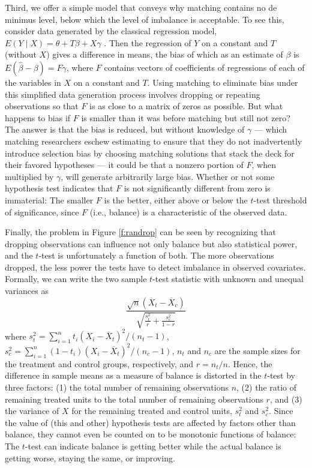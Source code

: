 \documentclass[11pt,titlepage]{article}
\begin{document}
Third, we offer a simple model that conveys why matching contains no
de minimus level, below which the level of imbalance is acceptable.
To see this, consider data generated by the classical regression
model, $E(Y\mid X)= \theta + T\beta + X\gamma$ \citep{Goldberger91}.
Then the regression of $Y$ on a constant and $T$ (without $X$) gives a
difference in means, the bias of which as an estimate of $\beta$ is
$E(\hat\beta-\beta) = F\gamma$, where $F$ contains vectors of
coefficients of regressions of each of the variables in $X$ on a
constant and $T$.  Using matching to eliminate bias under this
simplified data generation process involves dropping or repeating
observations so that $F$ is as close to a matrix of zeros as possible.
But what happens to bias if $F$ is smaller than it was before matching
but still not zero?  The answer is that the bias is reduced, but
without knowledge of $\gamma$ --- which matching researchers eschew
estimating to ensure that they do not inadvertently introduce
selection bias by choosing matching solutions that stack the deck for
their favored hypotheses --- it could be that a nonzero portion of
$F$, when multiplied by $\gamma$, will generate arbitrarily large
bias.  Whether or not some hypothesis test indicates that $F$ is not
significantly different from zero is immaterial: The smaller $F$ is
the better, either above or below the $t$-test threshold of
significance, since $F$ (i.e., balance) is a characteristic of the
observed data.

Finally, the problem in Figure \ref{f:randrop} can be seen by
recognizing that dropping observations can influence not only balance
but also statistical power, and the $t$-test is unfortunately a
function of both.  The more observations dropped, the less power the
tests have to detect imbalance in observed covariates.  Formally, we
can write the two sample $t$-test statistic with unknown and
unequal variances as
\begin{equation}
  \label{ttest} \frac{\sqrt{n}(\overline{X}_t-\overline{X}_c)}
               {\sqrt{\frac{s^2_t}{r} + \frac{s^2_c}{1-r}}}
\end{equation}
where $s^2_t=\sum_{i=1}^n t_i(X_i - \overline{X}_t)^2/(n_t-1)$,
$s^2_c=\sum_{i=1}^n (1-t_i)(X_i - \overline{X}_t)^2/(n_c-1)$, $n_t$
and $n_c$ are the sample sizes for the treatment and control groups,
respectively, and $r=n_t/n$.  Hence, the difference in sample means as
a measure of balance is distorted in the $t$-test by three factors:
(1) the total number of remaining observations $n$, (2) the ratio of
remaining treated units to the total number of remaining observations
$r$, and (3) the variance of $X$ for the remaining treated and control
units, $s_t^2$ and $s_c^2$.  Since the value of (this and other)
hypothesis tests are affected by factors other than balance, they
cannot even be counted on to be monotonic functions of balance: The
$t$-test can indicate balance is getting better while the actual
balance is getting worse, staying the same, or improving.
\end{document}
